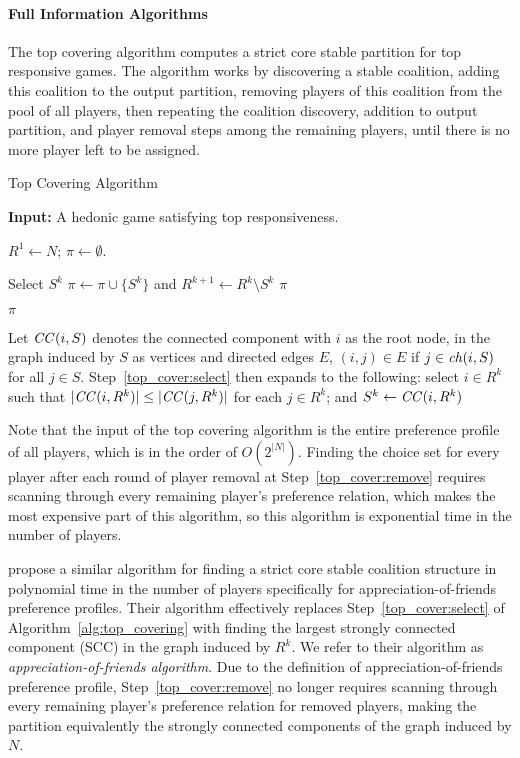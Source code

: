\paragraph{Full Information Algorithms}
\label{para:full_pref_algos}
The top covering algorithm computes a strict core stable partition for top
responsive games.
The algorithm works by discovering a stable coalition, adding this coalition
to the output partition, removing players of this coalition from the pool
of all players, then repeating the coalition discovery, addition to output
partition, and player removal steps among the remaining players, until there is
no more player left to be assigned.

\begin{algorithm}[htb]
  \caption{Top Covering Algorithm}
  \label{alg:top_covering}
  \textbf{Input:} A hedonic game satisfying top responsiveness.

  \begin{algorithmic}[1]
  \State $R^1 \leftarrow N$; $\pi \leftarrow \emptyset$.

    \State \label{top_cover:select} Select $S^k$
    \State \label{top_cover:remove} $\pi \leftarrow \pi \cup \lbrace S^k \rbrace$ and $R^{k+1} \leftarrow  R^k \setminus S^k$
      \State \Return $\pi$
    \EndIf
  \EndFor

  \State \Return $\pi$
 \end{algorithmic}
\end{algorithm}

Let $\mathit{CC}(i, S)$ denotes the connected component with $i$ as the root node,
in the graph induced by $S$ as vertices and directed edges $E$,
$(i, j) \in E$ if $j \in \mathit{ch}(i, S)$ for all $j \in S$.
Step~\ref{top_cover:select} then expands to the following: select $i\in R^k$ such
that $|\mathit{CC}(i,R^k)| \leq |\mathit{CC}(j,R^k)|$ for each $j\in R^k$;
and $S^k\leftarrow \mathit{CC}(i,R^k)$

Note that the input of the top covering algorithm is the entire preference profile
of all players, which is in the order of $O(2^{|N|})$.
Finding the choice set for every player after each round of player removal at
Step~\ref{top_cover:remove} requires scanning through every remaining player's
preference relation, which makes the most expensive part of this algorithm,
so this algorithm is exponential time in the number of players.

 propose a similar algorithm for finding a strict core
stable coalition structure in polynomial time in the number of players
specifically for appreciation-of-friends preference profiles.
Their algorithm effectively replaces Step~\ref{top_cover:select} of
Algorithm~\ref{alg:top_covering} with finding the largest strongly connected
component (SCC) in the graph induced by $R^k$.
We refer to their algorithm as \textit{appreciation-of-friends algorithm}.
Due to the definition of appreciation-of-friends preference profile,
Step~\ref{top_cover:remove} no longer requires scanning through every remaining
player's preference relation for removed players, making the partition
equivalently the strongly connected components of the graph induced by $N$.


